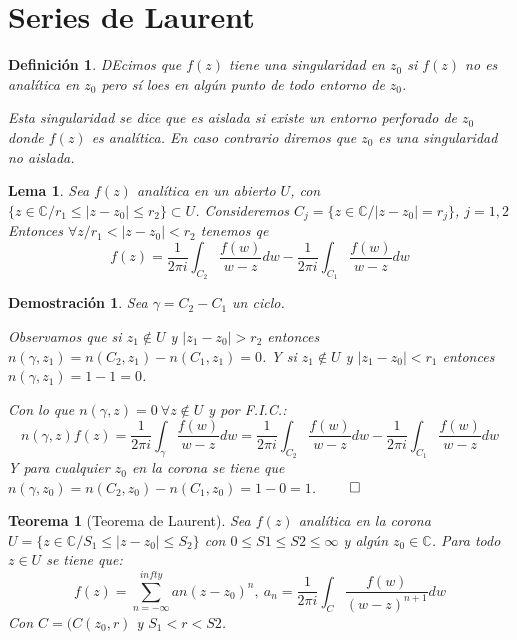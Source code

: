 \documentclass[12pt]{book}
\newtheorem{defi}{Definición}[chapter]
\newtheorem{theorem}{Teorema}[chapter]
\newtheorem*{dem}{Demostración}
\newtheorem{lema}{Lema}[chapter]
\newcommand{\C}{\mathbb{C}}
\begin{document}
\section{Series de Laurent}
\begin{defi}
DEcimos que $f(z)$ tiene una singularidad en $z_0$ si $f(z)$ no es analítica en $z_0$ pero sí loes en algún punto de todo entorno de $z_0$.

Esta singularidad se dice que es aislada si existe un entorno perforado de $z_0$ donde $f(z)$ es analítica. En caso contrario diremos que $z_0$ es una singularidad no aislada.
\end{defi}

\begin{lema}
Sea $f(z)$ analítica en un abierto $U$, con $\{z\in\C / r_1 \leq |z-z_0|\leq r_2\} \subset U$. Consideremos $C_j = \{z\in\C / |z-z_0| = r_j\}$, $j= 1,2$
Entonces $\forall z/ r_1 < |z-z_0| < r_2$ tenemos qe 
$$f(z) = \frac{1}{2\pi i} \int_{C_2} \frac{f(w)}{w-z}dw - \frac{1}{2\pi i} \int_{C_1} \frac{f(w)}{w-z}dw$$
\end{lema}

\begin{dem}
Sea $\gamma = C_2 -C_1$ un ciclo.

Observamos que si $z_1 \notin U$ y $|z_1-z_0|> r_2$ entonces $n(\gamma,z_1) = n(C_2,z_1) - n(C_1,z_1) = 0$. Y si $z_1 \notin U$ y $|z_1-z_0| <r_1$ entonces $n(\gamma,z_1) = 1-1 = 0$.

Con lo que $n(\gamma,z) = 0 \ \forall z\notin U$ y por F.I.C.:
$$n(\gamma,z)f(z) = \frac{1}{2\pi i} \int_{\gamma} \frac{f(w)}{w-z}dw = \frac{1}{2\pi i} \int_{C_2} \frac{f(w)}{w-z}dw - \frac{1}{2\pi i} \int_{C_1} \frac{f(w)}{w-z}dw$$
Y para cualquier $z_0$ en la corona se tiene que $n(\gamma,z_0) = n(C_2,z_0) - n(C_1,z_0)=1-0 = 1$. $\qed$
\end{dem}


\begin{theorem}[Teorema de Laurent]
Sea $f(z)$ analítica en la corona $U = \{z\in\C / S_1 \leq |z-z_0|\leq S_2\}$ con $0\leq S1\leq S2\leq \infty$ y algún $z_0 \in \C$. Para todo $z\in U$ se tiene que:
$$f(z) = \sum_{n=-\infty}^{infty} an(z-z_0)^n,\ a_n = \frac{1}{2\pi i}\int_C \frac{f(w)}{(w-z)^{n+1}}dw$$
Con $C = (C(z_0,r)$ y $S_1 < r< S2$.
\end{theorem}
\end{document}

